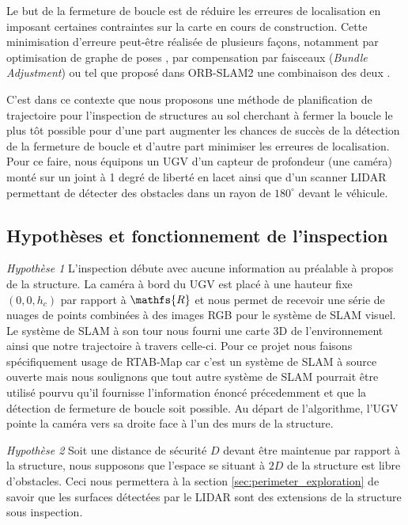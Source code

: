 Le but de la fermeture de boucle est de réduire les erreures de localisation en imposant certaines contraintes sur la carte en cours de construction. Cette minimisation d'erreure peut-être réalisée de plusieurs façons, notamment par optimisation de graphe de poses \citep{Carlone2016}, par compensation par faisceaux (\textit{Bundle Adjustment}) \citep{Mei2011} ou tel que proposé dans ORB-SLAM2 une combinaison des deux \citep{Mur-Artal2017}.

C'est dans ce contexte que nous proposons une méthode de planification de trajectoire pour l'inspection de structures au sol cherchant à fermer la boucle le plus tôt possible pour d'une part augmenter les chances de succès de la détection de la fermeture de boucle et d'autre part minimiser les erreures de localisation. Pour ce faire, nous équipons un UGV d'un capteur de profondeur (une caméra) monté sur un joint à 1 degré de liberté en lacet ainsi que d'un scanner LIDAR permettant de détecter des obstacles dans un rayon de $180^\circ$ devant le véhicule.



\subsection{Hypothèses et fonctionnement de l'inspection}
\label{sec:ugv_hypothesis}

\textit{Hypothèse 1} L'inspection débute avec aucune information au préalable à propos de la structure. La caméra à bord du UGV est placé à une hauteur fixe $(0,0,h_c)$ par rapport à $\mathfs{R}$ et nous permet de recevoir une série de nuages de points combinées à des images RGB pour le système de SLAM visuel. Le système de SLAM à son tour nous fourni une carte 3D de l'environnement ainsi que notre trajectoire à travers celle-ci. Pour ce projet nous faisons spécifiquement usage de RTAB-Map \citep{Labbe2014} car c'est un système de SLAM à source ouverte mais nous soulignons que tout autre système de SLAM pourrait être utilisé pourvu qu'il fournisse l'information énoncé précedemment et que la détection de fermeture de boucle soit possible. Au départ de l'algorithme, l'UGV pointe la caméra vers sa droite face à l'un des murs de la structure.

\textit{Hypothèse 2} Soit une distance de sécurité $D$ devant être maintenue par rapport à la structure, nous supposons que l'espace se situant à $2D$ de la structure est libre d'obstacles. Ceci nous permettera à la section \ref{sec:perimeter_exploration} de savoir que les surfaces détectées par le LIDAR sont des extensions de la structure sous inspection.

